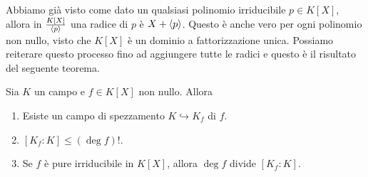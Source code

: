 
Abbiamo già visto come dato un qualsiasi polinomio irriducibile \(p \in K[X]\), allora in \(\frac{K[X]}{\left\langle p\right\rangle}\) una radice di \(p\) è \(X + \left\langle p\right\rangle\). Questo è anche vero per ogni polinomio non nullo, visto che \(K[X]\) è un dominio a fattorizzazione unica. Possiamo reiterare questo processo fino ad aggiungere tutte le radici e questo è il risultato del seguente teorema.

\begin{teor}\label{teor:EsistenzaCampoSpezzamento}
Sia \(K\) un campo e \(f \in K[X]\) non nullo. Allora
\begin{enumerate}
\item Esiste un campo di spezzamento \(K \hookrightarrow K_f\) di \(f\).
\item \(\left[K_f:K\right] \le (\deg f)!\).
\item Se \(f\) è pure irriducibile in \(K[X]\), allora \(\deg f\) divide \(\left[K_f:K\right]\).
\end{enumerate}
\end{teor}

